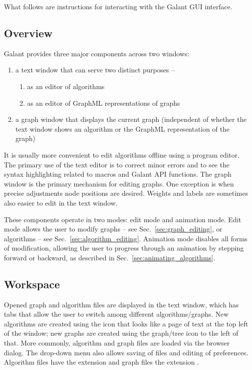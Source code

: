 
What follows are instructions for interacting with the Galant GUI interface.

\subsection{Overview}

Galant provides three major components across two windows:
\begin{enumerate}
\item
a text window that can serve two distinct purposes --
\begin{enumerate}
\item as an editor of algorithms
\item as an editor of GraphML representations of graphs
\end{enumerate}
\item
a graph window that displays the current graph (independent of whether
the text window shows an algorithm or the GraphML representation of the graph)
\end{enumerate}

It is usually more convenient to edit algorithms
offline using a program editor.
The primary use of the text editor is to correct minor errors and
to see the syntax highlighting related to macros and Galant API functions.
The graph window is the primary mechanism for editing graphs.
One exception is when precise adjustments node positions are desired.
Weights and labels are sometimes also easier to edit in the text window.



These components operate in two modes: edit mode and animation mode.
Edit mode allows the user to modify graphs -- see Sec.~\ref{sec:graph_editing},
or algorithms -- see Sec.~\ref{sec:algorithm_editing}. Animation mode disables all forms of modification, allowing the user to progress through
an animation by stepping forward or backward, as described in
Sec.~\ref{sec:animating_algorithms}.

\subsection{Workspace}

Opened graph and algorithm files are displayed in the text window,
which has tabs that allow the user to switch among different algorithms/graphs.
New algorithms are created using the icon that looks like
a page of text at the top left of the
window; new graphs are created
using the graph/tree icon to the left of that.
More commonly, algorithm and graph files are loaded via the 
browser dialog. The  drop-down menu also allows saving of files
and editing of preferences. Algorithm files have the extension 
and graph files the extension .

